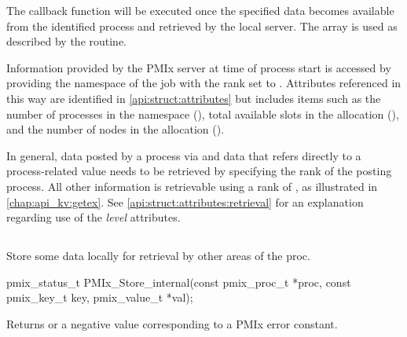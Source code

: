 \descr

The callback function will be executed once the specified data becomes available from the identified process and retrieved by the local server.
The  array is used as described by the  routine.

\adviceuserstart
Information provided by the \ac{PMIx} server at time of process start is accessed by providing the namespace of the job with the rank set to . Attributes referenced in this way are identified in \ref{api:struct:attributes} but includes items such as the number of processes in the namespace (), total available slots in the allocation (), and the number of nodes in the allocation ().

In general, data posted by a process via  and data that refers directly to a process-related value needs to be retrieved by specifying the rank of the posting process. All other information is retrievable using a rank of , as illustrated in \ref{chap:api_kv:getex}. See \ref{api:struct:attributes:retrieval} for an explanation regarding use of the \emph{level} attributes.
\adviceuserend


\subsection{}

\summary

Store some data locally for retrieval by other areas of the proc.

\format

\cspecificstart
\begin{codepar}
pmix_status_t
PMIx_Store_internal(const pmix_proc_t *proc,
                    const pmix_key_t key,
                    pmix_value_t *val);
\end{codepar}
\cspecificend

\begin{arglist}
\end{arglist}

Returns  or a negative value corresponding to a PMIx error constant.

\descr

